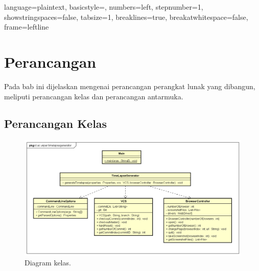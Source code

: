
\lstset
{ 
    language=plaintext,
    basicstyle=\footnotesize,
    numbers=left,
    stepnumber=1,
    showstringspaces=false,
    tabsize=1,
    breaklines=true,
    breakatwhitespace=false,
    frame=leftline
}



\chapter{Perancangan}
\label{chap:Perancangan}

Pada bab ini dijelaskan mengenai perancangan perangkat lunak yang dibangun, meliputi perancangan kelas dan perancangan antarmuka.

\section{Perancangan Kelas}
\label{sec:perancangan_kelas}
\begin{figure}[H]
	\centering
		\includegraphics[scale=0.5]{Gambar/ClassDiagram.png}
	\caption{Diagram kelas.}
	\label{fig:class_diagram}
\end{figure}

